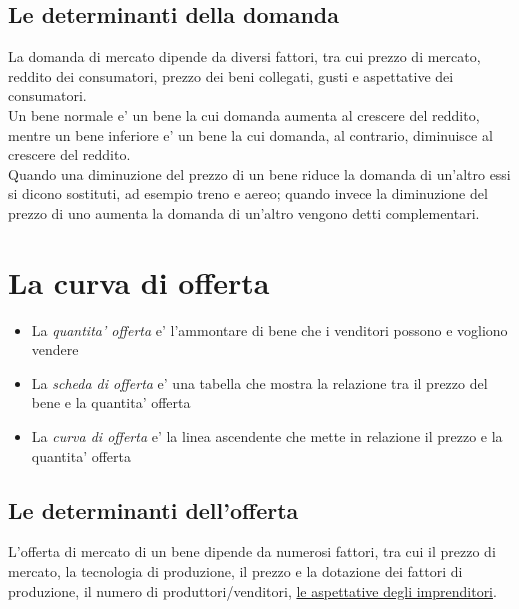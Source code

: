 \documentclass{report}
\begin{document}
	\subsection{Le determinanti della domanda}
	La domanda di mercato dipende da diversi fattori, tra cui prezzo di mercato, reddito dei consumatori, prezzo dei beni collegati, gusti e aspettative dei consumatori.
	\medskip \\Un bene normale e' un bene la cui domanda aumenta al crescere del reddito, mentre un bene inferiore e' un bene la cui domanda, al contrario, diminuisce al crescere del reddito.
	\medskip \\Quando una diminuzione del prezzo di un bene riduce la domanda di un'altro essi si dicono sostituti, ad esempio treno e aereo; quando invece la diminuzione del prezzo di uno aumenta la domanda di un'altro vengono detti complementari.
	\section{La curva di offerta}
	\begin{itemize}
		\item La \textit{quantita' offerta} e' l'ammontare di bene che i venditori possono e vogliono vendere
		\item La \textit{scheda di offerta} e' una tabella che mostra la relazione tra il prezzo del bene e la quantita' offerta
		\item La \textit{curva di offerta} e' la linea ascendente che mette in relazione il prezzo e la quantita' offerta
	\end{itemize}
	\subsection{Le determinanti dell'offerta}
	L'offerta di mercato di un bene dipende da numerosi fattori, tra cui il prezzo di mercato, la tecnologia di produzione, il prezzo e la dotazione dei fattori di produzione, il numero di produttori/venditori, \underline{le aspettative degli imprenditori}.
\end{document}
